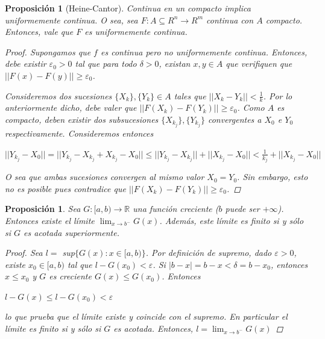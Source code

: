 \documentclass[]{article}
\newtheorem{prop}[teo]{Proposición}
\def\R{\mathbb{R}}
\def\e{\varepsilon}
\def\d{\delta}
\begin{document}
\begin{prop}[Heine-Cantor]
	Continua en un compacto implica uniformemente continua. O sea, sea $F:A\subseteq R^n \to R^m$ continua con $A$ compacto. Entonces, vale que $F$ es uniformemente continua.
	\begin{proof}
		Supongamos que $f$ es continua pero no \textit{uniformemente} continua. Entonces, debe existir $\e_0 > 0$ tal que para todo $\d > 0$, existan $x,y \in A$ que verifiquen que $||F(x) - F(y)|| \geq \e_0$.\newline
		
		Consideremos dos sucesiones $\{X_k\}, \{Y_k\} \in A$ tales que $||X_k - Y_k|| < \frac{1}{k}$. Por lo anteriormente dicho, debe valer que $||F(X_k) - F(Y_k)|| \geq \e_0$. Como $A$ es compacto, deben existir dos subsucesiones $\{X_{k_j}\}, \{Y_{k_j}\}$ convergentes a $X_0$ e $Y_0$ respectivamente. Consideremos entonces
		\begin{center} 
			$||Y_{k_j} - X_0|| = ||Y_{k_j} - X_{k_j} + X_{k_j} - X_0|| \leq ||Y_{k_j} - X_{k_j}|| + ||X_{k_j} - X_0|| < \frac{1}{k_j} + ||X_{k_j} - X_0||$
		\end{center}
		O sea que ambas sucesiones convergen al mismo valor $X_0 = Y_0$. Sin embargo, esto no es posible pues contradice que $||F(X_k) - F(Y_k)|| \geq \e_0$.
	\end{proof}
\end{prop}

\begin{prop}
	Sea $G:[a,b)\to\R$ una función creciente ($b$ puede ser $+\infty$). Entonces existe el límite $\displaystyle \lim_{x\to b^-}G(x)$. Además, este límite es finito si y sólo si $G$ es acotada superiormente.
	\begin{proof}
		Sea $l=$ sup$\{G(x):x\in[a,b)\}$. Por definición de supremo, dado $\e>0$, existe $x_0 \in [a,b)$ tal que $l-G(x_0) < \e$. Si $|b-x| = b - x < \delta = b-x_0$, entonces $x\leq x_0$ y $G$ es creciente $G(x) \leq G(x_0)$. Entonces
		\begin{center}
			$l-G(x) \leq l-G(x_0) < \e$
		\end{center}
		lo que prueba que el límite existe y coincide con el supremo. En particular el límite es finito si y sólo si $G$ es acotada.
		Entonces, $\displaystyle l=\lim_{x\to b^-}G(x)$
	\end{proof}
\end{prop}

\newpage
\end{document}
